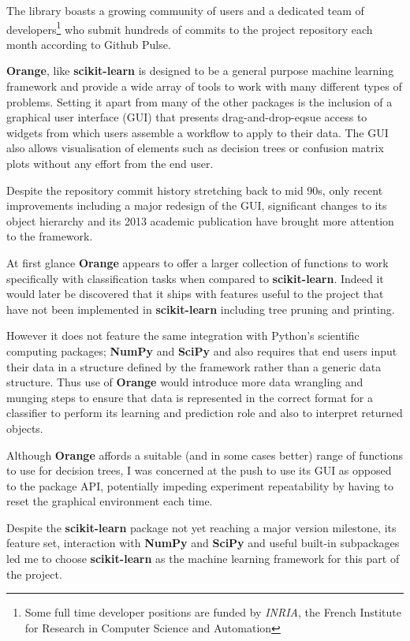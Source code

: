 The library boasts a growing community of users and a dedicated team of
developers\footnote{Some full time developer positions are funded by
\textit{INRIA}, the French Institute for Research in Computer Science and
Automation} who submit hundreds of commits to the project repository each month
according to Github Pulse.


\textbf{Orange}, like \textbf{scikit-learn} is designed to be a general purpose
machine learning framework and provide a wide array of tools to work with many
different types of problems. Setting it apart from many of the other packages is
the inclusion of a graphical user interface (GUI) that presents
drag-and-drop-eqsue access to widgets from which users assemble a workflow to
apply to their data. The GUI also allows visualisation of elements such as
decision trees or confusion matrix plots without any effort from the end user.

Despite the repository commit history stretching back to mid 90s, only recent
improvements including a major redesign of the GUI, significant changes to
its object hierarchy and its 2013 academic publication have brought more
attention to the framework.

At first glance \textbf{Orange} appears to offer a larger collection of
functions to work specifically with classification tasks when compared to
\textbf{scikit-learn}. Indeed it would later be discovered that it ships with
features useful to the project that have not been implemented in
\textbf{scikit-learn} including tree pruning and printing.

However it does not feature the same integration with
Python's scientific computing packages; \textbf{NumPy} and \textbf{SciPy} and
also requires that end users input their data in a structure defined by
the framework rather than a generic data structure.
Thus use of \textbf{Orange} would introduce more data wrangling and munging
steps to ensure that data is represented in the correct format for a classifier
to perform its learning and prediction role and also to interpret returned objects.

Although \textbf{Orange} affords a suitable (and in some cases better) range of
functions to use for decision trees, I was concerned at the push to use its GUI
as opposed to the package API, potentially impeding experiment repeatability by
having to reset the graphical environment each time.

Despite the \textbf{scikit-learn} package not yet reaching a major version
milestone, its feature set, interaction with \textbf{NumPy} and \textbf{SciPy}
and useful built-in subpackages led me to choose \textbf{scikit-learn} as the
machine learning framework for this part of the project.


